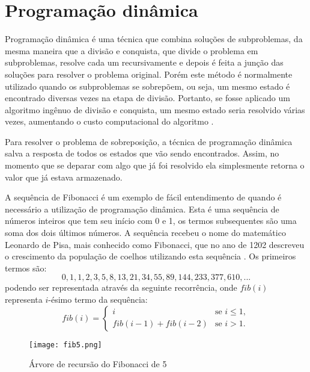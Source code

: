 \section{Programação dinâmica}
\label{sec:pd}

Programação dinâmica é uma técnica que combina soluções de subproblemas, da mesma maneira que a divisão e conquista, que divide o problema em subproblemas, resolve cada um recursivamente e depois é feita a junção das soluções para resolver o problema original. Porém este método é normalmente utilizado quando os subproblemas se sobrepõem, ou seja, um mesmo estado é encontrado diversas vezes na etapa de divisão. Portanto, se fosse aplicado um algoritmo ingênuo de divisão e conquista, um mesmo estado seria resolvido várias vezes, aumentando o custo computacional do algoritmo \cite{Cormen09a}. 

Para resolver o problema de sobreposição, a técnica de programação dinâmica salva a resposta de todos os estados que vão sendo encontrados. Assim, no momento que se deparar com algo que já foi resolvido ela simplesmente retorna o valor que já estava armazenado. 

A sequência de Fibonacci é um exemplo de fácil entendimento de quando é necessário a utilização de programação dinâmica. Esta é uma sequência de números inteiros que tem seu início com 0 e 1, os termos subsequentes são uma soma dos dois últimos números. A sequência recebeu o nome do matemático Leonardo de Pisa, mais conhecido como Fibonacci, que no ano de 1202 descreveu o crescimento da população de coelhos utilizando esta sequência \cite{LiveScience2013}. Os primeiros termos são:
\begin{equation}
0, 1, 1, 2, 3, 5, 8, 13, 21, 34, 55, 89, 144, 233, 377, 610, ...
\label{eq:fib}
\end{equation}
podendo ser representada através da seguinte recorrência, onde $fib(i)$ representa $i$-ésimo termo da sequência:
\begin{equation}
fib(i)=
\begin{cases}
i &\text{se } i \leq{1},\\
fib(i - 1) + fib(i - 2) &\text{se } i > {1}.
\end{cases}
\label{eq:fibrecorrence}
\end{equation}

\begin{figure}[H]
	\centering
	\caption[Árvore de recursão do Fibonacci de 5]{Árvore de recursão do Fibonacci de 5}
	\texttt{[image: fib5.png]} %
	\label{fig:fib5}
\end{figure}


